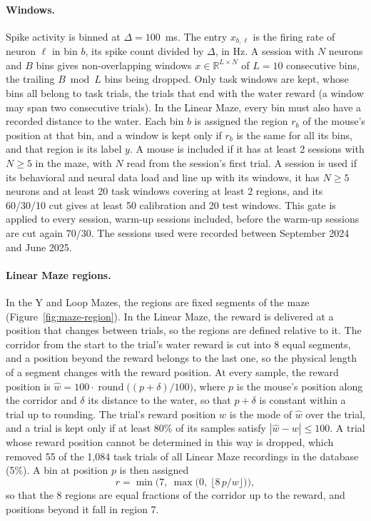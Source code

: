 \documentclass{article}
\begin{document}
\paragraph{Windows.} Spike activity is binned at $\Delta=100$~ms. The entry $x_{b,\ell}$ is the firing rate of neuron $\ell$ in bin $b$, its spike count divided by $\Delta$, in Hz. A session with $N$ neurons and $B$ bins gives non-overlapping windows $x\in\mathbb{R}^{L\times N}$ of $L=10$ consecutive bins, the trailing $B \bmod L$ bins being dropped. Only task windows are kept, whose bins all belong to task trials, the trials that end with the water reward (a window may span two consecutive trials). In the Linear Maze, every bin must also have a recorded distance to the water. Each bin $b$ is assigned the region $r_b$ of the mouse's position at that bin, and a window is kept only if $r_b$ is the same for all its bins, and that region is its label $y$. A mouse is included if it has at least 2 sessions with $N\ge5$ in the maze, with $N$ read from the session's first trial. A session is used if its behavioral and neural data load and line up with its windows, it has $N\ge5$ neurons and at least 20 task windows covering at least 2 regions, and its 60/30/10 cut gives at least 50 calibration and 20 test windows. This gate is applied to every session, warm-up sessions included, before the warm-up sessions are cut again 70/30. The sessions used were recorded between September 2024 and June 2025.

\paragraph{Linear Maze regions.} In the Y and Loop Mazes, the regions are fixed segments of the maze (Figure~\ref{fig:maze-region}). In the Linear Maze, the reward is delivered at a position that changes between trials, so the regions are defined relative to it. The corridor from the start to the trial's water reward is cut into 8 equal segments, and a position beyond the reward belongs to the last one, so the physical length of a segment changes with the reward position. At every sample, the reward position is $\hat w=100\cdot\operatorname{round}\big((p+\delta)/100\big)$, where $p$ is the mouse's position along the corridor and $\delta$ its distance to the water, so that $p+\delta$ is constant within a trial up to rounding. The trial's reward position $w$ is the mode of $\hat w$ over the trial, and a trial is kept only if at least 80\% of its samples satisfy $|\hat w-w|\le100$. A trial whose reward position cannot be determined in this way is dropped, which removed 55 of the 1{,}084 task trials of all Linear Maze recordings in the database (5\%). A bin at position $p$ is then assigned
\begin{equation}
  r=\min\!\big(7,\ \max\big(0,\ \lfloor 8\,p/w\rfloor\big)\big),
\end{equation}
so that the 8 regions are equal fractions of the corridor up to the reward, and positions beyond it fall in region 7.
\end{document}
